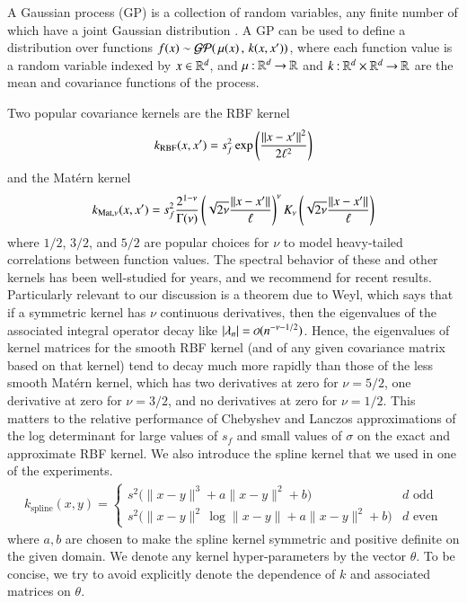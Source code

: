 A Gaussian process (GP) is a collection of random variables, any finite number
of which have a joint Gaussian distribution \citep[e.g.,][]{rasmussen06}. A GP
can be used to define a distribution over functions $f(x) \sim \mathcal{GP}(\,\mu
(x)\,,\,k(x, x'))$, where each function value is a random variable indexed by $x
\in \mathbb{R}^d$, and $\mu\mathbin{:} \mathbb{R}^d \mathbin{\rightarrow} \mathbb{R}$ and $k\mathbin{:}
\mathbb{R}^d \times\mathbb{R}^d\mathbin{\rightarrow} \mathbb{R}$ are the mean and covariance
functions of the process.

Two popular covariance kernels are the RBF kernel
\begin{equation}\label{eqn:kernel_rbf}
  k_{\text{RBF}}(x, x') = s_f^2 \exp\left(\frac{\left\lVert x-x'\right\rVert^2}{2\ell^2}\right)
\end{equation}
and the Mat\'ern kernel
\begin{equation}\label{eqn:kernel_matern}
  k_{\text{Mat},{\nu}}(x,x') =  s_f^2\frac{2^{1-\nu}}{\Gamma(\nu)} \left(
  \sqrt{2\nu}\frac{\left\lVert x-x'\right\rVert}{\ell}\right)^\nu K_\nu\left(\sqrt{2\nu}
  \frac{\left\lVert x-x'\right\rVert}{\ell}\right)
\end{equation}
where $1/2$, $3/2$, and $5/2$ are popular choices for $\nu$ to model 
heavy\hyp{}tailed correlations between function values. The spectral behavior of
these and other kernels has been well\hyp{}studied for years, and we recommend
\citep{wathen2015spectral} for recent results. Particularly relevant to our
discussion is a theorem due to Weyl, which says that if a symmetric kernel has
$\nu$ continuous derivatives, then the eigenvalues of the associated integral
operator decay like $\abs{\lambda_n} = \calo(n^{-\nu-1/2})$.  Hence, the
eigenvalues of kernel matrices for the smooth RBF kernel (and of any given
covariance matrix based on that kernel) tend to decay much more rapidly than
those of the less smooth Mat\'ern kernel, which has two derivatives at zero for
$\nu = 5/2$, one derivative at zero for $\nu = 3/2$, and no derivatives at zero
for $\nu = 1/2$.  This matters to the relative performance of Chebyshev and
Lanczos approximations of the log determinant for large values of $s_f$ and
small values of $\sigma$ on the exact and approximate RBF kernel. We also
introduce the spline kernel that we used in one of the experiments.
\begin{align}
  k_{\text{spline}}(x, y) = 
  \begin{cases}
    s^2 \big( \| x - y \|^3 + a\| x - y \|^2 + b \big) & d \text{ odd} \\
    s^2 \big( \| x - y \|^2\,\log \| x - y \| + a\| x - y \|^2 + b \big)  & d \text{ even}
  \end{cases}
\end{align}
where $a,b$ are chosen to make the spline kernel symmetric and positive definite
on the given domain. We denote any kernel hyper\hyp{}parameters by the vector
$\theta$. To be concise, we try to avoid explicitly denote the dependence of $k$
and associated matrices on $\theta$.

